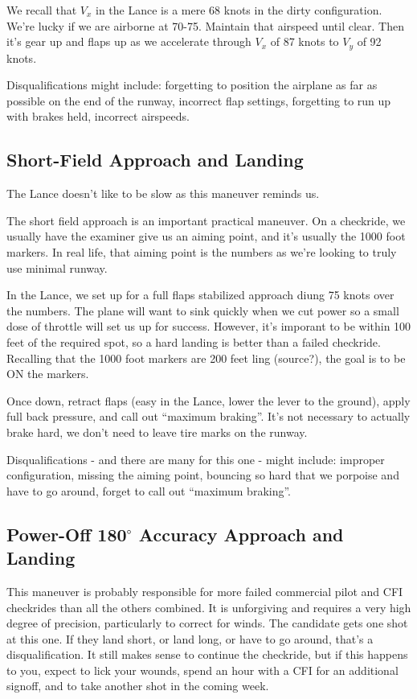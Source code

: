 We recall that $V_x$ in the Lance is a mere 68 knots in the dirty configuration. We're lucky if we are airborne at 70-75. Maintain that airspeed until clear. Then it's gear up and flaps up as we accelerate through $V_x$ of 87 knots to $V_y$ of 92 knots.

Disqualifications might include: forgetting to position the airplane as far as possible on the end of the runway, incorrect flap settings, forgetting to run up with brakes held, incorrect airspeeds.

\subsection{Short-Field Approach and Landing}

The Lance doesn't like to be slow as this maneuver reminds us.

The short field approach is an important practical maneuver. On a checkride, we usually have the examiner give us an aiming point, and it's usually the 1000 foot markers. In real life, that aiming point is the numbers as we're looking to truly use minimal runway.

In the Lance, we set up for a full flaps stabilized approach diung 75 knots over the numbers. The plane will want to sink quickly when we cut power so a small dose of throttle will set us up for success. However, it's imporant to be within 100 feet of the required spot, so a hard landing is better than a failed checkride. Recalling that the 1000 foot markers are 200 feet ling (source?), the goal is to be ON the markers.

Once down, retract flaps (easy in the Lance, lower the lever to the ground), apply full back pressure, and call out ``maximum braking''. It's not necessary to actually brake hard, we don't need to leave tire marks on the runway.

Disqualifications - and there are many for this one - might include: improper configuration, missing the aiming point, bouncing so hard that we porpoise and have to go around, forget to call out ``maximum braking''.

\subsection{Power-Off 180$^\circ$ Accuracy Approach and Landing}

This maneuver is probably responsible for more failed commercial pilot and CFI checkrides than all the others combined. It is unforgiving and requires a very high degree of precision, particularly to correct for winds. The candidate gets one shot at this one. If they land short, or land long, or have to go around, that's a disqualification. It still makes sense to continue the checkride, but if this happens to you, expect to lick your wounds, spend an hour with a CFI for an additional signoff, and to take another shot in the coming week.

